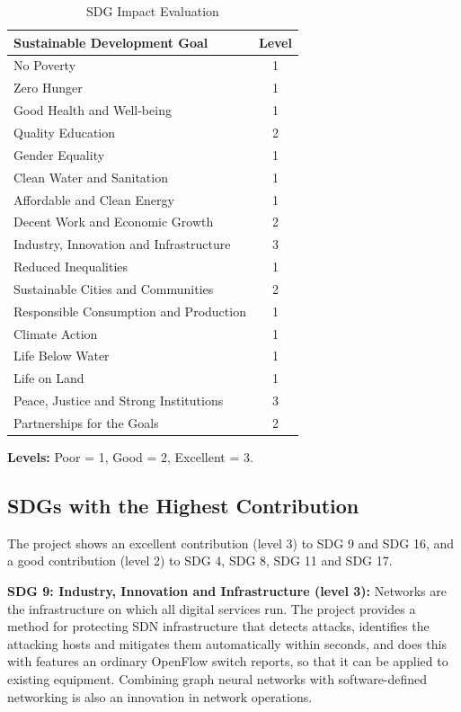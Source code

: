 \begin{appendices}
\begin{table}[htbp]
	\centering
	\caption{SDG Impact Evaluation}
	\label{tab:sdg-impact}
	\begin{tabular}{|p{10cm}|c|}
		\hline
		\textbf{Sustainable Development Goal} & \textbf{Level} \\
		\hline
		No Poverty & 1 \\ \hline
		Zero Hunger & 1 \\ \hline
		Good Health and Well-being & 1 \\ \hline
		Quality Education & 2 \\ \hline
		Gender Equality & 1 \\ \hline
		Clean Water and Sanitation & 1 \\ \hline
		Affordable and Clean Energy & 1 \\ \hline
		Decent Work and Economic Growth & 2 \\ \hline
		Industry, Innovation and Infrastructure & 3 \\ \hline
		Reduced Inequalities & 1 \\ \hline
		Sustainable Cities and Communities & 2 \\ \hline
		Responsible Consumption and Production & 1 \\ \hline
		Climate Action & 1 \\ \hline
		Life Below Water & 1 \\ \hline
		Life on Land & 1 \\ \hline
		Peace, Justice and Strong Institutions & 3 \\ \hline
		Partnerships for the Goals & 2 \\ \hline
	\end{tabular}
\end{table}

\noindent\textbf{Levels:} Poor = 1, Good = 2, Excellent = 3.

\subsection{SDGs with the Highest Contribution}

The project shows an excellent contribution (level 3) to SDG 9 and SDG 16, and a good contribution (level 2) to SDG 4, SDG 8, SDG 11 and SDG 17.

\textbf{SDG 9: Industry, Innovation and Infrastructure (level 3):}
Networks are the infrastructure on which all digital services run. The project provides a method for protecting SDN infrastructure that detects attacks, identifies the attacking hosts and mitigates them automatically within seconds, and does this with features an ordinary OpenFlow switch reports, so that it can be applied to existing equipment. Combining graph neural networks with software-defined networking is also an innovation in network operations.


\end{appendices}
